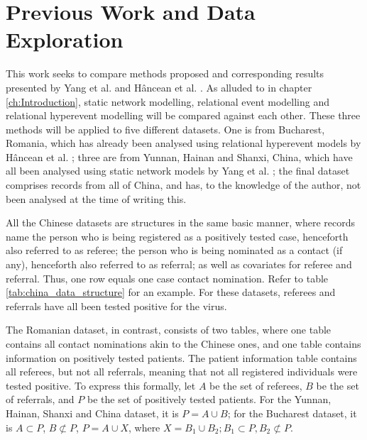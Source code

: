 \chapter{Previous Work and Data Exploration}
\label{ch:previous_work_data}

This work seeks to compare methods proposed and corresponding results presented by Yang et al. \cite{shaanxi_publication,hainan_publication} and Hâncean et al. \cite{hancean2022occupations}. As alluded to in chapter \ref{ch:Introduction}, static network modelling, relational event modelling and relational hyperevent modelling will be compared against each other. These three methods will be applied to five different datasets. One is from Bucharest, Romania, which has already been analysed using relational hyperevent models by Hâncean et al. \cite{hancean2022occupations}; three are from Yunnan, Hainan and Shanxi, China, which have all been analysed using static network models by Yang et al. \cite{hainan_publication,shaanxi_publication}; the final dataset comprises records from all of China, and has, to the knowledge of the author, not been analysed at the time of writing this.

All the Chinese datasets are structures in the same basic manner, where records name the person who is being registered as a positively tested case, henceforth also referred to as referee; the person who is being nominated as a contact (if any), henceforth also referred to as referral; as well as covariates for referee and referral. Thus, one row equals one case contact nomination. Refer to table \ref{tab:china_data_structure} for an example. For these datasets, referees and referrals have all been tested positive for the virus.

The Romanian dataset, in contrast, consists of two tables, where one table contains all contact nominations akin to the Chinese ones, and one table contains information on positively tested patients. The patient information table contains all referees, but not all referrals, meaning that not all registered individuals were tested positive. 
To express this formally, let $A$ be the set of referees, $B$ be the set of referrals, and $P$ be the set of positively tested patients. For the Yunnan, Hainan, Shanxi and China dataset, it is $P = A \cup B$; for the Bucharest dataset, it is $A \subset P$, $B \not\subset P$, $P = A \cup X$, where $X = B_1 \cup B_2; B_1 \subset P, B_2 \not\subset P$.

